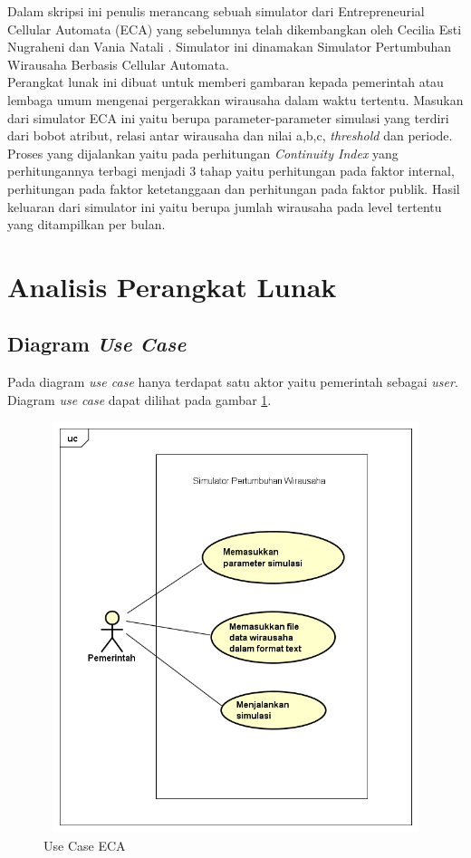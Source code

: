 Dalam skripsi ini penulis merancang sebuah simulator dari Entrepreneurial Cellular Automata (ECA) yang sebelumnya telah dikembangkan oleh Cecilia Esti Nugraheni dan Vania Natali \cite{ECA}. Simulator ini dinamakan Simulator Pertumbuhan Wirausaha Berbasis Cellular Automata.\\
Perangkat lunak ini dibuat untuk memberi gambaran kepada pemerintah atau lembaga umum mengenai pergerakkan wirausaha dalam waktu tertentu. Masukan dari simulator ECA ini yaitu berupa parameter-parameter simulasi yang terdiri dari bobot atribut, relasi antar wirausaha dan nilai a,b,c, \textit{threshold} dan periode. Proses yang dijalankan yaitu pada perhitungan \textit{Continuity Index} yang perhitungannya terbagi menjadi 3 tahap yaitu perhitungan pada faktor internal, perhitungan pada faktor ketetanggaan dan perhitungan pada faktor publik. Hasil keluaran dari simulator ini yaitu berupa jumlah wirausaha pada level tertentu yang ditampilkan per bulan.


\section{Analisis Perangkat Lunak}
\label{analisisPL}

\subsection{Diagram \textit{Use Case}}

Pada diagram \textit{use case} hanya terdapat satu aktor yaitu pemerintah sebagai \textit{user}. Diagram \textit{use case} dapat dilihat pada gambar \ref{fig:usecase}.

	\begin{figure} [H]
		\centering  
		\includegraphics[width=14cm, height=12cm]{UseCase2} 
		\caption[Use Case ECA]{Use Case ECA} 
		\label{fig:usecase} 
	\end{figure}
	
